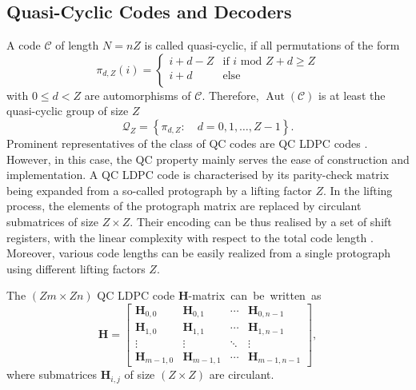 \documentclass[conference]{IEEEtran}
\newcommand\new[1]{#1}
\begin{document}
\begin{NoHyper}
\subsection{Quasi-Cyclic Codes and Decoders}
A code $\mathcal{C}$ of length $N=nZ$ is called quasi-cyclic, if all permutations of the form
\begin{equation}
    \pi_{d,Z}(i) = \begin{cases}
i+d-Z & \text{if }i \text{ mod } Z + d \ge Z\\
i+d & \text{else}\\
\end{cases}
\end{equation}
with $0\le d < Z$ are automorphisms of $\mathcal{C}$. Therefore, $\operatorname{Aut}(\mathcal{C})$ is at least the quasi-cyclic group of size $Z$
\begin{equation}
    \mathcal{Q}_Z = \left\{\pi_{d,Z}:\quad d=0,1,\dots, Z-1\right\}.
\end{equation}
Prominent representatives of the class of \ac{QC} codes are \ac{QC} \ac{LDPC} codes \cite{QCfossorier}. However, in this case, the \ac{QC} property mainly serves the ease of construction and implementation. A \ac{QC} \ac{LDPC} code is characterised by its parity-check matrix being expanded from a so-called protograph by a lifting factor $Z$. \new{In the lifting process, the elements of the protograph matrix are replaced by circulant submatrices of size $Z\times Z$. 
Their encoding can be thus realised by a set of shift registers, with the linear complexity with respect to the total code length \cite{QCefficientEncoding}}. Moreover, various code lengths can be easily realized from a single protograph using different lifting factors $Z$.

The $\left(Zm\times Zn\right)$ QC LDPC code $\mathbf{H}$-matrix~can~be~written~as  $$\mathbf{H}=\left[\begin{array}{cccc}
	\mathbf{H}_{0,0} & \mathbf{H}_{0,1} & \cdots & \mathbf{H}_{0,n-1}\\
	\mathbf{H}_{1,0} & \mathbf{H}_{1,1} & \cdots & \mathbf{H}_{1,n-1}\\
	\vdots & \vdots & \ddots & \vdots \\
	\mathbf{H}_{m-1,0} & \mathbf{H}_{m-1,1} & \cdots & \mathbf{H}_{m-1,n-1}
\end{array}\right],$$
where submatrices $\mathbf{H}_{i,j}$ of size $(Z\times Z)$ are circulant.


\end{NoHyper}
\end{document}
